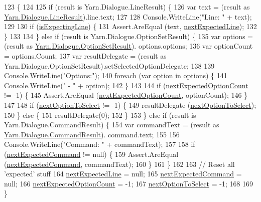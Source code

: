 \begin{DoxyCode}
123                                                                        \{
124 
125             \textcolor{keywordflow}{if} (result is Yarn.Dialogue.LineResult) \{
126                 var text = (result as \hyperlink{a00122}{Yarn.Dialogue.LineResult}).line.text;
127 
128                 Console.WriteLine(\textcolor{stringliteral}{"Line: "} + text);
129 
130                 \textcolor{keywordflow}{if} (\hyperlink{a00160_a47f35b8e8123ed9471883d02b8bc9f3e}{isExpectingLine}) \{
131                     Assert.AreEqual (text, \hyperlink{a00160_a3651ffb5425ab15bd1e42749347c1ee7}{nextExpectedLine});
132                 \}
133 
134             \} \textcolor{keywordflow}{else} \textcolor{keywordflow}{if} (result is Yarn.Dialogue.OptionSetResult) \{
135                 var options = (result as \hyperlink{a00135}{Yarn.Dialogue.OptionSetResult}).
      options.options;
136                 var optionCount = options.Count;
137                 var resultDelegate = (result as Yarn.Dialogue.OptionSetResult).setSelectedOptionDelegate;
138 
139                 Console.WriteLine(\textcolor{stringliteral}{"Options:"});
140                 \textcolor{keywordflow}{foreach} (var option \textcolor{keywordflow}{in} options) \{
141                     Console.WriteLine(\textcolor{stringliteral}{" - "} + option);
142                 \}
143 
144                 \textcolor{keywordflow}{if} (\hyperlink{a00160_aaabaf15249efe42f3d857129bdbc2864}{nextExpectedOptionCount} != -1) \{
145                     Assert.AreEqual (\hyperlink{a00160_aaabaf15249efe42f3d857129bdbc2864}{nextExpectedOptionCount}, optionCount);
146                 \}
147 
148                 \textcolor{keywordflow}{if} (\hyperlink{a00160_a343055fa693e9d5dfc1bdbfcd0f02676}{nextOptionToSelect} != -1) \{
149                     resultDelegate (\hyperlink{a00160_a343055fa693e9d5dfc1bdbfcd0f02676}{nextOptionToSelect});
150                 \} \textcolor{keywordflow}{else} \{
151                     resultDelegate(0);
152                 \}
153             \} \textcolor{keywordflow}{else} \textcolor{keywordflow}{if} (result is Yarn.Dialogue.CommandResult) \{
154                 var commandText = (result as \hyperlink{a00042}{Yarn.Dialogue.CommandResult}).
      command.text;
155 
156                 Console.WriteLine(\textcolor{stringliteral}{"Command: "} + commandText);
157 
158                 \textcolor{keywordflow}{if} (\hyperlink{a00160_a26fae5694fc06c3cdb12d3108dbc34de}{nextExpectedCommand} != null) \{
159                     Assert.AreEqual (\hyperlink{a00160_a26fae5694fc06c3cdb12d3108dbc34de}{nextExpectedCommand}, commandText);
160                 \}
161             \}
162 
163             \textcolor{comment}{// Reset all 'expected' stuff}
164             \hyperlink{a00160_a3651ffb5425ab15bd1e42749347c1ee7}{nextExpectedLine} = null;
165             \hyperlink{a00160_a26fae5694fc06c3cdb12d3108dbc34de}{nextExpectedCommand} = null;
166             \hyperlink{a00160_aaabaf15249efe42f3d857129bdbc2864}{nextExpectedOptionCount} = -1;
167             \hyperlink{a00160_a343055fa693e9d5dfc1bdbfcd0f02676}{nextOptionToSelect} = -1;
168 
169         \}
\end{DoxyCode}
